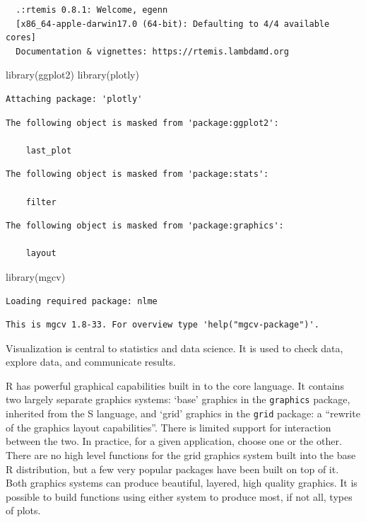 \documentclass[
]{book}
\newenvironment{Shaded}{\begin{snugshade}}{\end{snugshade}}
\newcommand{\FunctionTok}[1]{\textcolor[rgb]{0.00,0.00,0.00}{#1}}
\newcommand{\NormalTok}[1]{#1}
\begin{document}
\begin{verbatim}
  .:rtemis 0.8.1: Welcome, egenn
  [x86_64-apple-darwin17.0 (64-bit): Defaulting to 4/4 available cores]
  Documentation & vignettes: https://rtemis.lambdamd.org
\end{verbatim}

\begin{Shaded}
\begin{Highlighting}[]
\FunctionTok{library}\NormalTok{(ggplot2)}
\FunctionTok{library}\NormalTok{(plotly)}
\end{Highlighting}
\end{Shaded}

\begin{verbatim}
Attaching package: 'plotly'
\end{verbatim}

\begin{verbatim}
The following object is masked from 'package:ggplot2':

    last_plot
\end{verbatim}

\begin{verbatim}
The following object is masked from 'package:stats':

    filter
\end{verbatim}

\begin{verbatim}
The following object is masked from 'package:graphics':

    layout
\end{verbatim}

\begin{Shaded}
\begin{Highlighting}[]
\FunctionTok{library}\NormalTok{(mgcv)}
\end{Highlighting}
\end{Shaded}

\begin{verbatim}
Loading required package: nlme
\end{verbatim}

\begin{verbatim}
This is mgcv 1.8-33. For overview type 'help("mgcv-package")'.
\end{verbatim}

Visualization is central to statistics and data science. It is used to check data, explore data, and communicate results.

R has powerful graphical capabilities built in to the core language. It contains two largely separate graphics systems: `base' graphics in the \texttt{graphics} package, inherited from the S language, and `grid' graphics in the \texttt{grid} package: a ``rewrite of the graphics layout capabilities''. There is limited support for interaction between the two. In practice, for a given application, choose one or the other. There are no high level functions for the grid graphics system built into the base R distribution, but a few very popular packages have been built on top of it. Both graphics systems can produce beautiful, layered, high quality graphics. It is possible to build functions using either system to produce most, if not all, types of plots.
\end{document}

